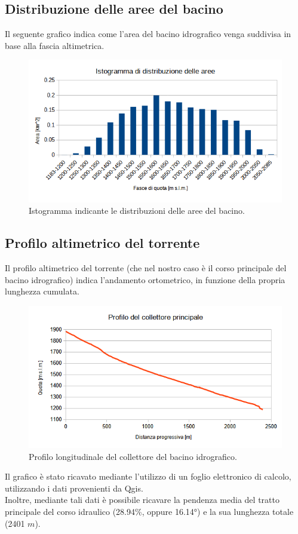 \subsection{Distribuzione delle aree del bacino}
Il seguente grafico indica come l'area del bacino idrografico venga suddivisa in base alla fascia altimetrica.
\begin{figure}[H] \centering
    \includegraphics[scale=0.8]{immagini/istogramma_distribuzione_aree.png}
    \caption{Istogramma indicante le distribuzioni delle aree del bacino.}
\end{figure}

\subsection{Profilo altimetrico del torrente}
Il profilo altimetrico del torrente (che nel nostro caso è il corso principale del bacino idrografico) indica l'andamento ortometrico, in funzione della propria lunghezza cumulata.
\begin{figure}[H] \centering
    \includegraphics[scale=0.8]{immagini/prof_coll_princ.png}
    \caption{Profilo longitudinale del collettore del bacino idrografico.}
\end{figure}
Il grafico è stato ricavato mediante l'utilizzo di un foglio elettronico di calcolo, utilizzando i dati provenienti da Qgis.\\
Inoltre, mediante tali dati è possibile ricavare la pendenza media del tratto principale del corso idraulico (28.94\%, oppure 16.14°) e la sua lunghezza totale (2401 $m$).


